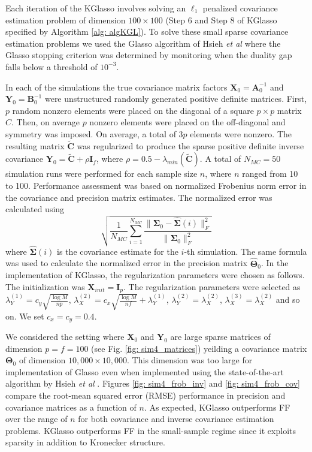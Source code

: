 \documentclass[journal,11pt,draftcls,onecolumn]{IEEEtran}
\def\bA{ {\mathbf{A}} }
\def\bB{ {\mathbf{B}} }
\def\bC{ {\mathbf{C}} }
\def\bI{ {\mathbf{I}} }
\def\bX{ {\mathbf{X}} }
\def\bY{ {\mathbf{Y}} }
\def\bTheta{ {\mathbf{\Theta}} }
\def\bSigma{ {\mathbf{\Sigma}} }
\def\nn{{ \parallel   }}
\begin{document}
Each iteration of the KGlasso involves solving an $\ell_1$ penalized covariance estimation problem of dimension $100 \times 100$ (Step 6 and Step 8 of KGlasso specified by Algorithm \ref{alg: algKGL}). To solve these small sparse covariance estimation problems we used the Glasso algorithm of Hsieh {\it et al} \cite{HsiehNIPS11} where the Glasso stopping criterion was determined by monitoring when the duality gap falls below a threshold of $10^{-3}$.

In each of the simulations the true covariance matrix factors  $\bX_0=\bA_0^{-1}$ and $\bY_0=\bB_0^{-1}$ were unstructured randomly generated positive definite matrices. First, $p$ random nonzero elements were placed on the diagonal of a square $p \times p$ matrix $C$. Then, on average $p$ nonzero elements were placed on the off-diagonal and symmetry was imposed. On average, a total of $3p$ elements were nonzero. The resulting matrix $\tilde{\bC}$ was regularized to produce the sparse positive definite inverse covariance $\bY_0 = \tilde{\bC} + \rho \bI_f$, where $\rho = 0.5-\lambda_{min}(\tilde{\bC})$. A total of $N_{MC}=50$ simulation runs were performed for each sample size $n$, where $n$ ranged from 10 to 100. Performance assessment was based on normalized Frobenius norm error in the covariance and precision matrix estimates. The normalized error was calculated using
\begin{equation*}
	\sqrt{ \frac{1}{N_{MC}} \sum_{i=1}^{N_{MC}}{ \frac{\nn \bSigma_{0}-\hat{\bSigma}(i) \nn_F^2}{\nn \bSigma_0 \nn_F^2} } }
\end{equation*}
where $\hat{\bSigma}(i)$ is the covariance estimate for the $i$-th simulation. The same formula was  used to calculate the normalized error in the precision matrix $\hat{\bTheta}_0$.
In the implementation of KGlasso, the regularization parameters were chosen as follows. The initialization was $\bX_{init}=\bI_p$. The regularization parameters were selected as $\lambda_Y^{(1)}= c_y \sqrt{\frac{\log M}{np}}$, $\lambda_X^{(2)}= c_x \sqrt{\frac{\log M}{nf}} + \lambda_Y^{(1)}$, $\lambda_Y^{(2)} = \lambda_X^{(2)}$, $\lambda_X^{(3)}= \lambda_X^{(2)}$ and so on. We set $c_x=c_y=0.4$.

We considered the setting where $\bX_0$ and $\bY_0$ are large sparse matrices of dimension $p=f=100$ (see Fig. \ref{fig: sim4_matrices}) yeilding a covariance matrix $\bTheta_0$ of dimension $10,000 \times 10,000$. This dimension was too large for implementation of Glasso even when implemented using the state-of-the-art algorithm by Hsieh {\it et al} \cite{HsiehNIPS11}. Figures \ref{fig: sim4_frob_inv} and \ref{fig: sim4_frob_cov} compare the root-mean squared error (RMSE) performance in precision and covariance matrices as a function of $n$. As expected, KGlasso outperforms FF over the range of $n$ for both covariance and inverse covariance estimation problems. KGlasso outperforms FF in the small-sample regime since it exploits sparsity in addition to Kronecker structure.
\end{document}
